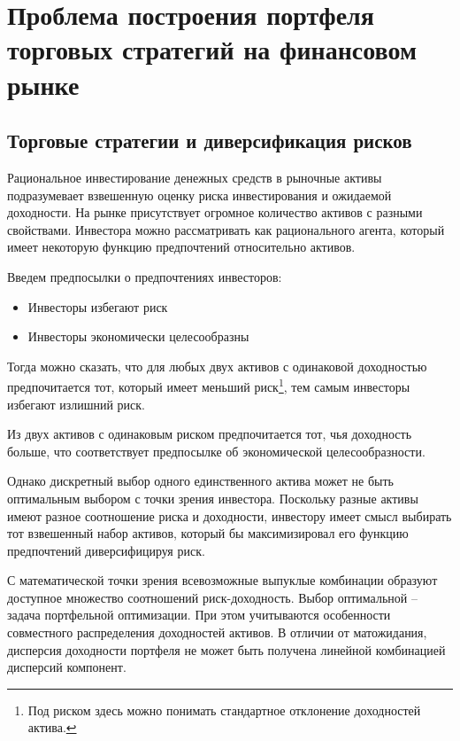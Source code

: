 \chapter{Проблема построения портфеля торговых стратегий на финансовом рынке}
\section{Торговые стратегии и диверсификация рисков}
Рациональное инвестирование денежных средств в рыночные активы подразумевает взвешенную оценку риска инвестирования и ожидаемой доходности. 
На рынке присутствует огромное количество активов с разными свойствами. 
Инвестора можно рассматривать как рационального агента, который имеет некоторую функцию предпочтений относительно активов.

Введем предпосылки о предпочтениях инвесторов:
\begin{itemize}
	\item Инвесторы избегают риск
	\item Инвесторы экономически целесообразны
\end{itemize}
Тогда можно сказать, что для любых двух активов с одинаковой доходностью предпочитается тот, который имеет меньший риск\footnote{Под риском здесь можно понимать стандартное отклонение доходностей актива.}, тем самым инвесторы избегают излишний риск.  

Из двух активов с одинаковым риском предпочитается тот, чья доходность больше, что соответствует предпосылке об экономической целесообразности.

Однако дискретный выбор одного единственного актива может не быть оптимальным выбором с точки зрения инвестора. Поскольку разные активы имеют разное соотношение риска и доходности, инвестору имеет смысл выбирать тот взвешенный набор активов, который бы максимизировал его функцию предпочтений диверсифицируя риск.

С математической точки зрения всевозможные выпуклые комбинации образуют доступное множество соотношений риск-доходность. Выбор оптимальной -- задача портфельной оптимизации. При этом учитываются особенности совместного распределения доходностей активов. В отличии от матожидания, дисперсия доходности портфеля не может быть получена линейной комбинацией дисперсий компонент. 

